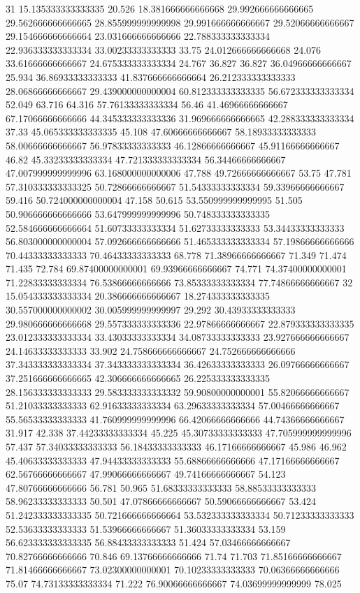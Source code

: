 31 15.135333333333335 20.526 18.381666666666668 29.992666666666665 29.562666666666665 28.855999999999998 29.991666666666667 29.52066666666667 29.154666666666664 23.031666666666666 22.788333333333334 22.936333333333334 33.00233333333333 33.75 24.012666666666668 24.076 33.61666666666667 24.675333333333334 24.767 36.827 36.827 36.04966666666667 25.934 36.86933333333333 41.837666666666664 26.212333333333333 28.06866666666667 29.439000000000004 60.812333333333335 56.672333333333334 52.049 63.716 64.316 57.76133333333334 56.46 41.46966666666667 67.17066666666666 44.345333333333336 31.969666666666665 42.288333333333334 37.33 45.065333333333335 45.108 47.60666666666667 58.18933333333333 58.00666666666667 56.97833333333333 46.12866666666667 45.91166666666667 46.82 45.33233333333334 47.721333333333334 56.34466666666667 47.007999999999996 63.168000000000006 47.788 49.72666666666667 53.75 47.781 57.310333333333325 50.72866666666667 51.54333333333334 59.33966666666667 59.416 50.724000000000004 47.158 50.615 53.550999999999995 51.505 50.906666666666666 53.647999999999996 50.748333333333335 52.584666666666664 51.60733333333334 51.62733333333333 53.34433333333333 56.803000000000004 57.092666666666666 51.465333333333334 57.19866666666666 70.44333333333333 70.46433333333333 68.778 71.38966666666667 71.349 71.474 71.435 72.784 69.87400000000001 69.93966666666667 74.771 74.37400000000001 71.22833333333334 76.53866666666666 73.85333333333334 77.74866666666667
32 15.054333333333334 20.386666666666667 18.274333333333335 30.557000000000002 30.005999999999997 29.292 30.43933333333333 29.980666666666668 29.557333333333336 22.97866666666667 22.879333333333335 23.012333333333334 33.43033333333334 34.08733333333333 23.927666666666667 24.14633333333333 33.902 24.758666666666667 24.752666666666666 37.343333333333334 37.343333333333334 36.42633333333333 26.09766666666667 37.251666666666665 42.306666666666665 26.225333333333335 28.156333333333333 29.583333333333332 59.90800000000001 55.82066666666667 51.21033333333333 62.91633333333334 63.29633333333334 57.00466666666667 55.56533333333333 41.760999999999996 66.42066666666666 44.74366666666667 31.917 42.338 37.44233333333334 45.225 45.30733333333333 47.705999999999996 57.437 57.34033333333333 56.18433333333333 46.17166666666667 45.986 46.962 45.40633333333333 47.94433333333333 55.68866666666666 47.17166666666667 62.56766666666667 47.99066666666667 49.74166666666667 54.123 47.80766666666666 56.781 50.965 51.68333333333333 58.88533333333333 58.96233333333333 50.501 47.07866666666667 50.59066666666667 53.424 51.242333333333335 50.721666666666664 53.532333333333334 50.71233333333333 52.53633333333333 51.53966666666667 51.36033333333334 53.159 56.623333333333335 56.88433333333333 51.424 57.03466666666667 70.82766666666666 70.846 69.13766666666666 71.74 71.703 71.85166666666667 71.81466666666667 73.02300000000001 70.10233333333333 70.06366666666666 75.07 74.73133333333334 71.222 76.90066666666667 74.03699999999999 78.025
